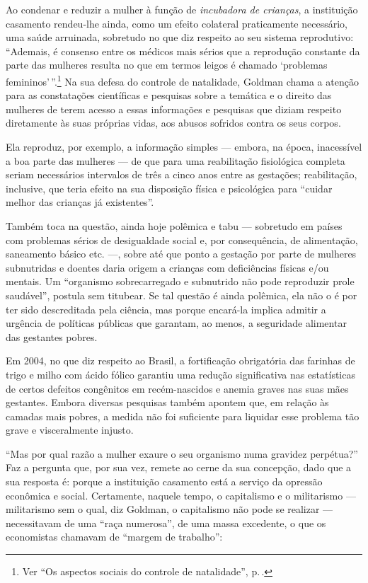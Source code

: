 Ao condenar e reduzir a mulher à função de \textit{incubadora de crianças}, a
instituição casamento rendeu-lhe ainda, como um efeito colateral
praticamente necessário, uma saúde arruinada, sobretudo no que diz
respeito ao seu sistema reprodutivo: ``Ademais, é consenso entre os médicos mais sérios que a reprodução constante da parte das mulheres resulta no que em termos leigos é
chamado `problemas femininos'\,''.\footnote{Ver ``Os aspectos sociais do controle de natalidade'', p.\,\pageref{saude}.} Na
sua defesa do controle de natalidade, Goldman chama a atenção
para as constatações científicas e pesquisas sobre a temática e o
direito das mulheres de terem acesso a essas informações e pesquisas que
diziam respeito diretamente às suas próprias vidas, aos abusos sofridos
contra os seus corpos.

Ela reproduz, por exemplo, a informação simples
--- embora, na época, inacessível a boa parte das mulheres --- de que
para uma reabilitação fisiológica completa seriam necessários intervalos
de três a cinco anos entre as gestações; reabilitação, inclusive, que
teria efeito na sua disposição física e psicológica para ``cuidar melhor
das crianças já existentes''.

Também toca na questão, ainda hoje polêmica e tabu --- sobretudo em países com problemas sérios de desigualdade
social e, por consequência, de alimentação, saneamento básico etc. ---,
sobre até que ponto a gestação por parte de mulheres subnutridas e
doentes daria origem a crianças com deficiências físicas e/ou mentais.
Um ``organismo sobrecarregado e subnutrido não pode reproduzir prole
saudável'', postula sem titubear. Se tal questão é ainda polêmica, ela
não o é por ter sido descreditada pela ciência, mas porque encará-la
implica admitir a urgência de políticas públicas que garantam, ao menos,
a seguridade alimentar das gestantes pobres.

Em 2004, no que diz respeito ao
Brasil, a fortificação obrigatória
das farinhas de trigo e milho com ácido fólico garantiu uma redução
significativa nas estatísticas de certos defeitos congênitos em
recém-nascidos e anemia graves nas suas mães gestantes. Embora
diversas pesquisas também apontem que, em relação às camadas
mais pobres, a medida não foi suficiente para liquidar esse problema tão
grave e visceralmente injusto.

``Mas por qual razão a mulher exaure o seu organismo numa gravidez
perpétua?'' Faz a pergunta que, por sua vez, remete ao cerne da sua
concepção, dado que a sua resposta é: porque a instituição casamento
está a serviço da opressão econômica e social. Certamente, naquele
tempo, o capitalismo e o militarismo --- militarismo sem o qual, diz
Goldman, o capitalismo não pode se realizar --- necessitavam de uma
``raça numerosa'', de uma massa excedente, o que os economistas chamavam
de ``margem de trabalho'':


